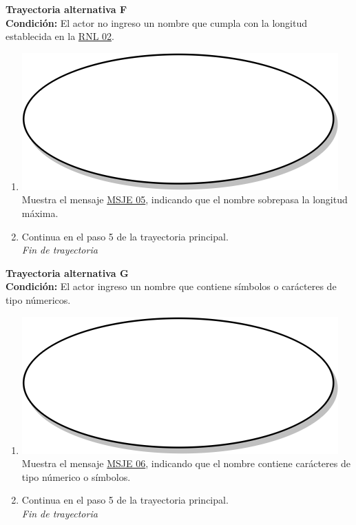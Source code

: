 \textbf{Trayectoria alternativa F} \label{cu2_ta_f}\\
\textbf{Condición:} El actor no ingreso un nombre que cumpla con la longitud establecida en la \hyperref[rnl_02]{RNL 02}.\\
 \begin{enumerate}[label=F\arabic*]
    \item {\includegraphics[scale=.05]{Capitulo3/img/proceso.png} Muestra el mensaje \hyperref[msje_05]{MSJE 05}, indicando que el nombre sobrepasa la longitud máxima.}
    \item {Continua en el paso 5 de la trayectoria principal.} \\
    \textit{Fin de trayectoria} \\
\end{enumerate}

\textbf{Trayectoria alternativa G} \label{cu2_ta_g}\\
\textbf{Condición:} El actor ingreso un nombre que contiene símbolos o carácteres de tipo númericos.\\
 \begin{enumerate}[label=G\arabic*]
    \item {\includegraphics[scale=.05]{Capitulo3/img/proceso.png} Muestra el mensaje \hyperref[msje_06]{MSJE 06}, indicando que el nombre contiene carácteres de tipo númerico o símbolos.}
    \item {Continua en el paso 5 de la trayectoria principal.} \\
    \textit{Fin de trayectoria} \\
\end{enumerate}

